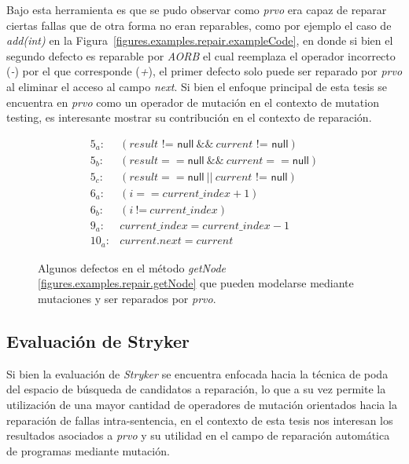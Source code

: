 Bajo esta herramienta es que se pudo observar como \emph{prvo} era capaz de reparar ciertas fallas que de otra forma no eran reparables, como por ejemplo el caso de \emph{add(int)} en la Figura~\ref{figures.examples.repair.exampleCode}, en donde si bien el segundo defecto es reparable por \emph{AORB} el cual reemplaza el operador incorrecto (\emph{-}) por el que corresponde (\emph{+}), el primer defecto solo puede ser reparado por \emph{prvo} al eliminar el acceso al campo \emph{next}. Si bien el enfoque principal de esta tesis se encuentra en \emph{prvo} como un operador de mutaci\'on en el contexto de mutation testing, es interesante mostrar su contribuci\'on en el contexto de reparaci\'on.

\begin{figure}[t]
	\footnotesize
	$$
	\begin{array}{rl}
	5_a: & (\mathit{result} \mbox{ != }\mathsf{null}\ \&\&\ \mathit{current}\mbox{ != }\mathsf{null})\\
	5_b: & (\mathit{result} == \mathsf{null}\ \&\&\ \mathit{current} == \mathsf{null})\\
	5_c: & (\mathit{result} == \mathsf{null}\ ||\ \mathit{current}\mbox{ != }\mathsf{null})\\
	6_a: & (\mathit{i} == \mathit{current\_index} + 1)\\
	6_b: & (\mathit{i}\ \mbox{!=}\ \mathit{current\_index})\\
	9_a: & \mathit{current\_index} = \mathit{current\_index} - 1\\
	10_a: & \mathit{current.next} = \mathit{current}
	\end{array}
	$$
	\normalsize
	\caption{Algunos defectos en el m\'etodo \emph{getNode} \ref{figures.examples.repair.getNode} que pueden modelarse mediante mutaciones y ser reparados por \emph{prvo}.}
	\label{figures.examples.repair.faultsGetNode}
\end{figure}

\subsection{Evaluaci\'on de Stryker}
\label{sec:repair.striker.evaluation}

Si bien la evaluaci\'on de \emph{Stryker} se encuentra enfocada hacia la t\'ecnica de poda del espacio de b\'usqueda de candidatos a reparaci\'on, lo que a su vez permite la utilizaci\'on de una mayor cantidad de operadores de mutaci\'on orientados hacia la reparaci\'on de fallas intra-sentencia, en el contexto de esta tesis nos interesan los resultados asociados a \emph{prvo} y su utilidad en el campo de reparaci\'on autom\'atica de programas mediante mutaci\'on.

